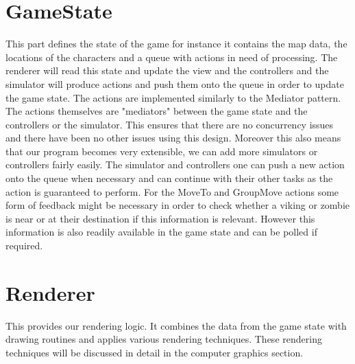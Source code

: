 \section{GameState}
This part defines the state of the game for instance it contains the map data, the locations of the characters and a queue with actions in need of processing. The renderer will read this state and update the view and the controllers and the simulator will produce actions and push them onto the queue in order to update the game state. The actions are implemented similarly to the Mediator pattern. The actions themselves are "mediators" between the game state and the controllers or the simulator.
This ensures that there are no concurrency issues and there have been no other issues using this design. Moreover this also means that our program becomes very extensible, we can add more simulators or controllers fairly easily. The simulator and controllers one can push a new action onto the queue when necessary and can continue with their other tasks as the action is guaranteed to perform. For the MoveTo and GroupMove actions some form of feedback might be necessary in order to check whether a viking or zombie is near or at their destination if this information is relevant. However this information is also readily available in the game state and can be polled if required. 
\section{Renderer}
This provides our rendering logic. It combines the data from the game state with drawing routines and applies various rendering techniques. These rendering techniques will be discussed in detail in the computer graphics section.
